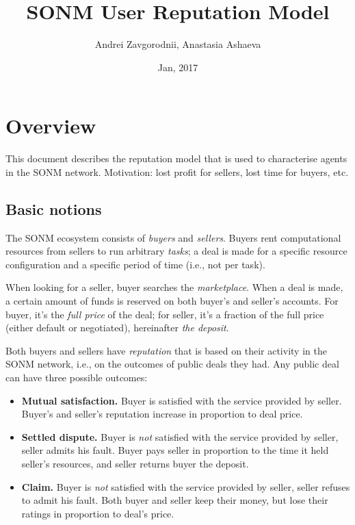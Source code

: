 \documentclass[11pt]{article}
\title{SONM User Reputation Model}
\author{Andrei Zavgorodnii, Anastasia Ashaeva}
\date{Jan, 2017}
\begin{document}
\maketitle
\tableofcontents
 
\section{Overview} \label{overview}

This document describes the reputation model that is used to characterise agents in the SONM network. Motivation: lost profit for sellers, lost time for buyers, etc.

\subsection{Basic notions} \label{basicNotions}

The SONM ecosystem consists of \textit{buyers} and \textit{sellers}. Buyers rent computational resources from sellers to run arbitrary \textit{tasks}; a deal is made for a specific resource configuration and a specific period of time (i.e., not per task).

When looking for a seller, buyer searches the \textit{marketplace}. When a deal is made, a certain amount of funds is reserved on both buyer's and seller's accounts. For buyer, it's the \textit{full price} of the deal; for seller, it's a fraction of the full price (either default or negotiated), hereinafter \textit{the deposit}.

Both buyers and sellers have \textit{reputation} that is based on their activity in the SONM network, i.e., on the outcomes of public deals they had. Any public deal can have three possible outcomes:

\begin{itemize}
\item \textbf{Mutual satisfaction.} Buyer is satisfied with the service provided by seller. Buyer's and seller's reputation increase in proportion to deal price.
\item \textbf{Settled dispute.} Buyer is \textit{not} satisfied with the service provided by seller, seller admits his fault. Buyer pays seller in proportion to the time it held seller's resources, and seller returns buyer the deposit.
\item \textbf{Claim.} Buyer is \textit{not} satisfied with the service provided by seller, seller refuses to admit his fault. Both buyer and seller keep their money, but lose their ratings in proportion to deal's price.
\end{itemize}
\end{document}
